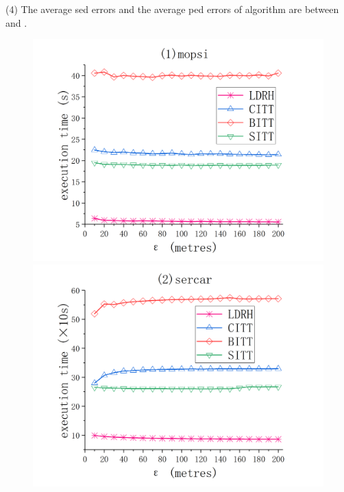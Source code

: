 {{\ni (4) The average sed errors and the average ped errors of algorithm \bitt are between \citt and \sitt.



\begin{figure}[tb!]
	\centering
	\includegraphics[scale = 0.210]{figures/Fig-mopsi-running-time.png}\hspace{1ex}
	\includegraphics[scale = 0.210]{figures/Fig-sercar-running-time.png}\hspace{1ex}

\end{figure}}}
